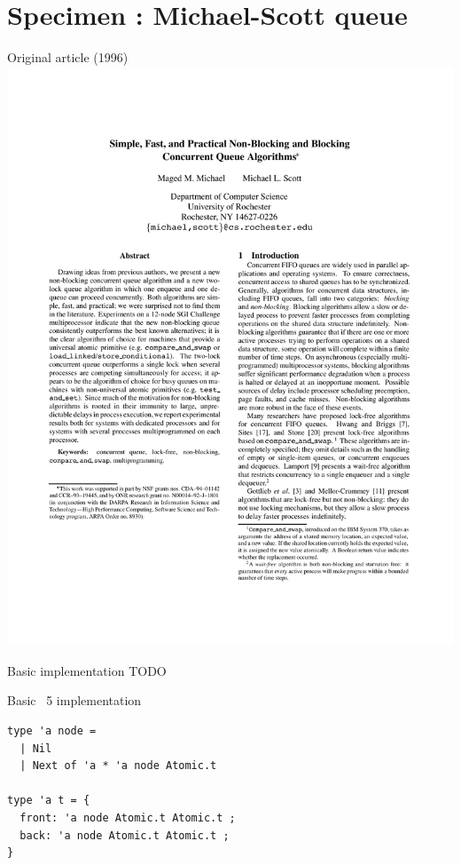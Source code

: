 \section{Specimen  : Michael-Scott queue}


\begin{frame}{Original article (1996)}
\centering
\includegraphics[scale=0.5]{images/michael_scott_1996.pdf}
\end{frame}


\begin{frame}{Basic implementation}
TODO
\end{frame}


\begin{frame}[fragile]{Basic \OCaml~5 implementation}
\begin{verbatim}
type 'a node =
  | Nil
  | Next of 'a * 'a node Atomic.t

type 'a t = {
  front: 'a node Atomic.t Atomic.t ;
  back: 'a node Atomic.t Atomic.t ;
}
\end{verbatim}
\end{frame}

